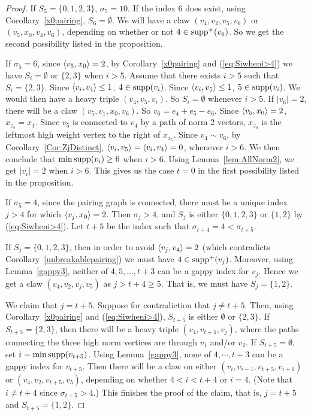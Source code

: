 \begin{proof}
If $S_5=\{0,1,2,3\}$, $\sigma_5=10$. If the index $6$ does exist, using Corollary~\ref{x0pairing}, $S_6=\emptyset$. We will have a claw $(v_4,v_2,v_5,v_6)$ or $(v_5,x_0,v_4,v_6)$, depending on whether or not $4\in \operatorname{supp}^+(v_6)$. So we get the second possibility listed in the proposition.

If $\sigma_5=6$, since $\left\langle v_5 , x_0 \right\rangle=2$, by Corollary~\ref{x0pairing} and (\ref{eq:Siwheni>4}) we have $S_i=\emptyset$ or $\{2,3\}$ when $i>5$.
Assume that there exists $i>5$ such that $S_i=\{2,3\}$. Since $\left\langle v_i , v_4 \right\rangle\le1$, $4\in\operatorname{supp}(v_i)$. Since $\left\langle v_i , v_5 \right\rangle\le1$, $5\in\operatorname{supp}(v_i)$. We would then have a heavy triple $(v_4,v_5,v_i)$. So $S_i=\emptyset$ whenever $i>5$.
If $|v_6|=2$, there will be a claw $(v_5,v_1,x_0,v_6)$. So $v_6=e_4+e_5-e_6$.
Since $\left\langle v_5 , x_0 \right\rangle=2$, $x_{z_5}=x_1$. Since $v_5$ is connected to $v_4$ by a path of norm 2 vectors, $x_{z_4}$ is the leftmost high weight vertex to the right of $x_{z_5}$. Since $v_4\sim v_6$, by Corollary~\ref{Cor:ZjDistinct}, 
$\left\langle v_i , v_5 \right\rangle=\left\langle v_i , v_4 \right\rangle=0$, whenever $i>6$.
We  then conclude that $\min\operatorname{supp}(v_i)\ge6$ when $i>6$. Using Lemma~\ref{lem:AllNorm2}, we get $|v_i|=2$ when $i>6$. This gives us the case $t=0$ in the first possibility listed in the proposition.

If $\sigma_5=4$, 
since the pairing graph is connected, there must be a unique index $j>4$ for which $\left\langle v_j , x_0 \right\rangle=2$. Then $\sigma_j>4$, and $S_j$ is either $\{ 0,1,2,3\}$ or $\{ 1,2\}$ by (\ref{eq:Siwheni>4}). Let $t+5$ be the index such that $\sigma_{t+4}=4<\sigma_{t+5}$.

If $S_j=\{ 0,1,2,3\}$, then in order to avoid $\left\langle v_j , v_4 \right\rangle=2$  (which contradicts Corollary~\ref{unbreakablepairing}) we must have $4\in \operatorname{supp}^+(v_j)$. Moreover, using Lemma~\ref{gappy3}, neither of $4,5,\dots, t+3$ can be a gappy index for $v_j$. Hence we get a claw $(v_4, v_2, v_j, v_5)$ as $j>t+4\ge5$. That is, we must have $S_j=\{ 1,2 \}$. 

We claim that $j=t+5$. Suppose for contradiction that $j \ne t+5$. Then, using Corollary~\ref{x0pairing} and (\ref{eq:Siwheni>4}), $S_{t+5}$ is either $\emptyset$ or $\{ 2, 3\}$. If $S_{t+5} = \{ 2,3\}$, then there will be a heavy triple $(v_4, v_{t+5}, v_j)$, where the paths connecting the three high norm vertices are through $v_1$ and/or $v_2$. If $S_{t+5}=\emptyset$, set $i=\min\operatorname{supp}(v_{t+5})$. Using Lemma~\ref{gappy3}, none of $4, \cdots, t+3$ can be a gappy index for $v_{t+5}$. Then there will be a claw on either $(v_i, v_{i-1}, v_{t+5}, v_{i+1})$ or $(v_4, v_2, v_{t+5}, v_5)$, depending on whether $4<i<t+4$ or $i=4$. (Note that $i\not = t+4$ since $\sigma_{t+5}>4$.) This finishes the proof of the claim, that is, $j=t+5$ and $S_{t+5}=\{ 1,2\}$. 


\end{proof}
